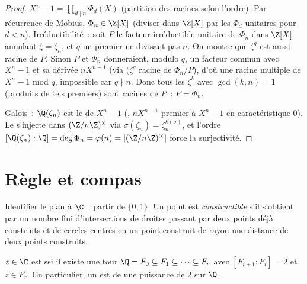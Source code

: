 \begin{proof}
$X^n - 1 = \prod_{d \mid n} \Phi_d(X)$ (partition des racines
selon l'ordre). Par récurrence de Möbius, $\Phi_n \in \Z[X]$
(diviser dans $\Z[X]$ par les $\Phi_d$ unitaires pour $d < n$).
Irréductibilité~: soit $P$ le facteur irréductible unitaire de
$\Phi_n$ dans $\Z[X]$ annulant $\zeta = \zeta_n$, et $q$ un
premier ne divisant pas $n$. On montre que $\zeta^q$ est aussi
racine de $P$. Sinon $P$ et $\Phi_n$ donneraient, modulo $q$, un
facteur commun avec $X^n - 1$ et sa dérivée $nX^{n-1}$ (via
$(\zeta^q$ racine de $\Phi_n/P$), d'où une racine multiple de
$X^n - 1$ mod $q$, impossible car $q \nmid n$. Donc tous les
$\zeta^k$ avec $\gcd(k,n)=1$ (produits de tels premiers) sont
racines de $P$~: $P = \Phi_n$.

Galois~: $\Q(\zeta_n)$ est le  de $X^n -
1$ (, $nX^{n-1}$ premier à $X^n-1$ en caractéristique
$0$). Le  s'injecte dans $(\Z/n\Z)^\times$ via
$\sigma(\zeta_n) = \zeta_n^{k(\sigma)}$, et l'ordre
$[\Q(\zeta_n):\Q] = \deg\Phi_n = \varphi(n) =
|(\Z/n\Z)^\times|$ force la surjectivité.
\end{proof}

\section{Règle et compas}

\begin{definition}\label{def:b3:galois:constructible}
Identifier le plan à $\C$~; partir de $\{0, 1\}$. Un point est
\emph{constructible} s'il s'obtient
par un nombre fini d'intersections de droites passant par deux
points déjà construits et de cercles centrés en un point
construit de rayon une distance de deux points construits.
\end{definition}

\begin{theorem}[Wantzel]\label{thm:b3:galois:wantzel}
$z \in \C$ est  ssi il existe une tour $\Q = F_0
\subseteq F_1 \subseteq \dots \subseteq F_r$ avec $[F_{i+1} :
F_i] = 2$ et $z \in F_r$. En particulier, un  est  de  une puissance de $2$ sur
$\Q$.
\end{theorem}

